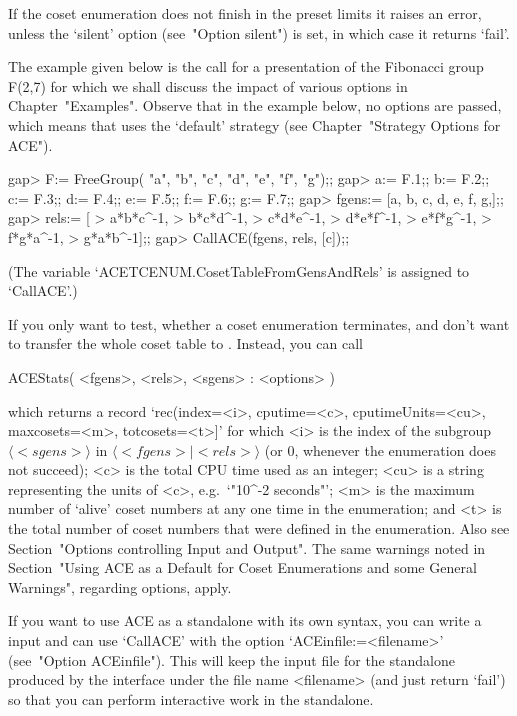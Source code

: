 If the coset enumeration does not  finish  in  the  preset  limits  it
raises an error, unless the `silent' option (see~"Option  silent")  is
set, in which case it returns `fail'.

The example given  below  is  the  call  for  a  presentation  of  the
Fibonacci group F(2,7) for  which  we  shall  discuss  the  impact  of
various options in Chapter~"Examples". Observe  that  in  the  example
below, no options  are  passed,  which  means  that  {\ACE}  uses  the
`default' strategy (see Chapter~"Strategy Options for ACE").

\begintt
gap> F:= FreeGroup( "a", "b", "c", "d", "e", "f", "g");;
gap> a:= F.1;; b:= F.2;; c:= F.3;; d:= F.4;; e:= F.5;; f:= F.6;; g:= F.7;;
gap> fgens:= [a, b, c, d, e, f, g,];;
gap> rels:= [
> a*b*c^-1,
> b*c*d^-1,
> c*d*e^-1,
> d*e*f^-1,
> e*f*g^-1,
> f*g*a^-1,
> g*a*b^-1];;
gap> CallACE(fgens, rels, [c]);;
\endtt

(The  variable  `ACETCENUM.CosetTableFromGensAndRels'  is assigned  to
`CallACE'.)

If you only want to  test, whether a coset enumeration terminates, and
don't want to  transfer the whole coset table  to {\GAP}. Instead, you
can call

\>ACEStats( <fgens>, <rels>, <sgens> : <options> )

which returns a record `rec(index=<i>, cputime=<c>, cputimeUnits=<cu>,
maxcosets=<m>, totcosets=<t>]' for which  <i>  is  the  index  of  the
subgroup $\langle <sgens> \rangle$ in  $\langle  <fgens>  \mid  <rels>
\rangle$ (or $0$, whenever the enumeration does not succeed);  <c>  is
the total CPU time used as an integer; <cu> is a  string  representing
the units of <c>, e.g.~`"10^-2 seconds"'; <m> is the maximum number of
\lq{}alive' coset numbers at any one time in the enumeration; and  <t>
is the total  number  of  coset  numbers  that  were  defined  in  the
enumeration. Also see Section~"Options controlling Input and  Output".
The same warnings noted in Section~"Using ACE as a Default  for  Coset
Enumerations and some General Warnings", regarding options, apply.


If you want to use ACE as a standalone with its own  syntax,  you  can
write  a  {\GAP}  input  and  can  use  `CallACE'  with   the   option
`ACEinfile:=<filename>' (see~"Option ACEinfile"). This will  keep  the
input file for the {\ACE} standalone produced by the {\GAP}  interface
under the file name <filename> (and just return `fail')  so  that  you
can perform interactive work in the standalone.

